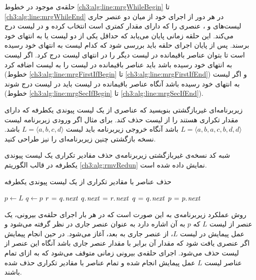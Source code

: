 حلقه‌ی {} موجود در خطوط {\ref{ch3:alg:line:mrgWhileBegin}} تا {\ref{ch3:alg:line:mrgWhileEnd}} در هر دور از اجرای خود از میان دو عنصر جاری لیست‌های {} و {}، عنصری را که دارای مقدار کمتری است انتخاب کرده و در لیست {} درج می‌کند. این حلقه زمانی پایان می‌یابد که حداقل یکی از دو لیست {} یا {} به انتهای خود برسند. پس از پایان اجرای حلقه باید بررسی شود که کدام لیست به انتهای خود رسیده است تا بتوان عناصر باقیمانده در لیست دیگر را در انتهای لیست {} درج کرد. اگر لیست {} به انتهای خود رسیده باشد باید عناصر باقیمانده در لیست {} را به لیست {} اضافه کرد (خطوط {\ref{ch3:alg:line:mrgFirstIfBegin}} تا {\ref{ch3:alg:line:mrgFirstIfEnd}}) و اگر لیست {} به انتهای خود رسیده باشد آنگاه عناصر باقیمانده در لیست {} باید در لیست {} درج شوند (خطوط {\ref{ch3:alg:line:mrgSecIfBegin}} تا {\ref{ch3:alg:line:mrgSecIfEnd}}).

 زیربرنامه‌ای غیربازگشتی بنویسید که عناصری از یک لیست پیوندی یکطرفه که دارای مقدار تکراری هستند را از لیست حذف کند. برای مثال اگر ورودی زیربرنامه لیست {$L=\langle a,b,a,c,b,d,d\rangle$} باشد آنگاه خروجی زیربرنامه باید لیست {$L=\langle a,b,c,d\rangle$} باشد. نسخه بازگشتی چنین زیربرنامه‌ای  را نیز طراحی کنید.


شبه کد نسخه‌ی غیربازگشتی زیربرنامه‌ی حذف مقادیر تکراری یک لیست پیوندی یکطرفه در قالب الگوریتم {\eqref{ch3:alg:rmvRedun}} نمایش داده شده است.
\begin{algorithm}
\caption{حذف عناصر با مقادیر تکراری از یک لیست پیوندی یکطرفه}\label{ch3:alg:rmvRedun}
\begin{latin}
\begin{algorithmic}[1]
				\State	\Return
		\EndIf
		\State	$p \gets L$
				\State	$q \gets p$
								\State	$r \mathrel{\hspace{1pt}=\hspace{1pt}} q.\hspace*{1pt}\mathit{next}$
								\State	$q.\hspace*{1pt}\mathit{next} \mathrel{\hspace{1pt}=\hspace{1pt}} r.\hspace*{1pt}\mathit{next}$
								\State	{}
						\Else
								\State	$q \mathrel{\hspace{1pt}=\hspace{1pt}} q.\hspace*{1pt}\mathit{next}$
						\EndIf
				\EndWhile
				\State	$p \mathrel{\hspace{1pt}=\hspace{1pt}} p.\hspace*{1pt}\mathit{next}$
		\EndWhile		
\EndProcedure
\end{algorithmic}
\end{latin}
\end{algorithm}

روش عملکرد زیربرنامه‌ی {} به این صورت است که در هر بار اجرای حلقه‌ی {} بیرونی، یک عنصر از لیست {$L$} که {$p$} به آن اشاره دارد به عنوان عنصر جاری در نظر گرفته می‌شود و عمل پیمایش در لیست {$L$}، از عنصر جاری به بعد، آغاز می‌شود. در حین انجام پیمایش اگر عنصری یافت شود که مقدار آن برابر با مقدار عنصر جاری باشد آنگاه این عنصر از لیست حذف می‌شود. اجرای حلقه‌ی {} بیرونی زمانی متوقف می‌شود که به ازای تمام عناصر لیست {$L$} عمل پیمایش انجام شده و تمام عناصر با مقادیر تکراری حذف شده باشند.

